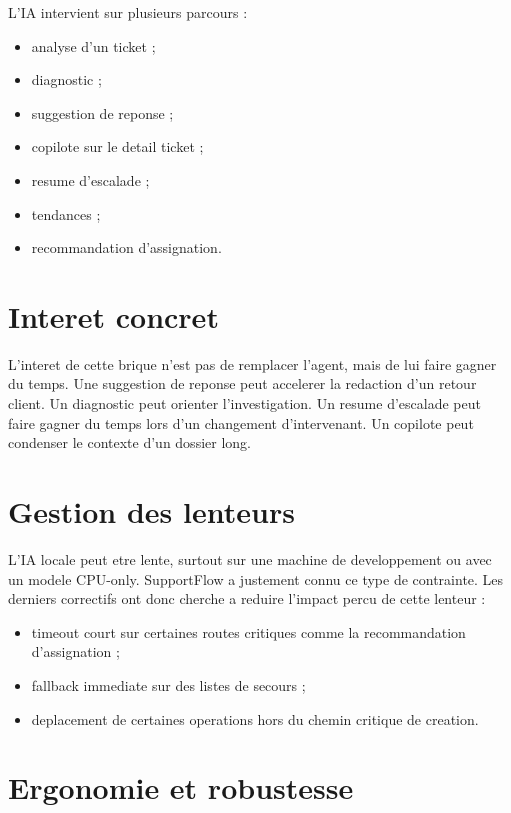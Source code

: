 L'IA intervient sur plusieurs parcours :

\begin{itemize}[leftmargin=1.2cm]
  \item analyse d'un ticket ;
  \item diagnostic ;
  \item suggestion de reponse ;
  \item copilote sur le detail ticket ;
  \item resume d'escalade ;
  \item tendances ;
  \item recommandation d'assignation.
\end{itemize}

\section{Interet concret}

L'interet de cette brique n'est pas de remplacer l'agent, mais de lui faire gagner du temps. Une suggestion de reponse peut accelerer la redaction d'un retour client. Un diagnostic peut orienter l'investigation. Un resume d'escalade peut faire gagner du temps lors d'un changement d'intervenant. Un copilote peut condenser le contexte d'un dossier long.

\section{Gestion des lenteurs}

L'IA locale peut etre lente, surtout sur une machine de developpement ou avec un modele CPU-only. SupportFlow a justement connu ce type de contrainte. Les derniers correctifs ont donc cherche a reduire l'impact percu de cette lenteur :

\begin{itemize}[leftmargin=1.2cm]
  \item timeout court sur certaines routes critiques comme la recommandation d'assignation ;
  \item fallback immediate sur des listes de secours ;
  \item deplacement de certaines operations hors du chemin critique de creation.
\end{itemize}

\section{Ergonomie et robustesse}

